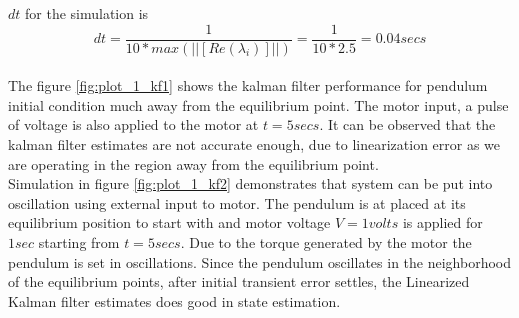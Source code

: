 \documentclass[a4paper]{article}
\begin{document}
$dt$ for the simulation is \[dt = \frac{1}{10*max(||[Re(\lambda_i)]||)} = \frac{1}{10*2.5} = 0.04secs\]\\

The figure \ref{fig:plot_1_kf1} shows the kalman filter performance for pendulum initial condition much away from the equilibrium point. The motor input, a pulse of voltage is also applied to the motor at $t = 5secs$. It can be observed that the kalman filter estimates are not accurate enough, due to linearization error as we are operating in the region away from the equilibrium point.\\

Simulation in figure \ref{fig:plot_1_kf2} demonstrates that system can be put into oscillation using external input to motor. The pendulum is at placed at its equilibrium position to start with and motor voltage $V = 1volts$ is applied for $1sec$ starting from $t =5secs$. Due to the torque generated by the motor the pendulum is set in oscillations. Since the pendulum oscillates in the neighborhood of the equilibrium points, after initial transient error settles, the Linearized Kalman filter estimates does good in state estimation. \\
\end{document}
